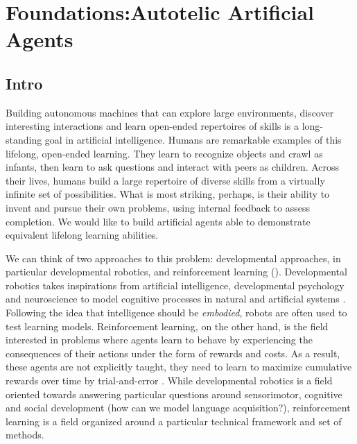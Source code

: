 \chapter{Foundations:Autotelic Artificial Agents}

\section{Intro}

Building autonomous machines that can explore large environments, discover interesting interactions and learn open-ended repertoires of skills is a long-standing goal in artificial intelligence. Humans are remarkable examples of this lifelong, open-ended learning. They learn to recognize objects and crawl as infants, then learn to ask questions and interact with peers as children. Across their lives, humans build a large repertoire of diverse skills from a virtually infinite set of possibilities. What is most striking, perhaps, is their ability to invent and pursue their own problems, using internal feedback to assess completion. We would like to build artificial agents able to demonstrate equivalent lifelong learning abilities.


We can think of two approaches to this problem: developmental approaches, in particular developmental robotics, and reinforcement learning (\rl). Developmental robotics takes inspirations from artificial intelligence, developmental psychology and neuroscience to model cognitive processes in natural and artificial systems \cite{asada2009cognitive,cangelosi2015developmental}. Following the idea that intelligence should be \textit{embodied}, robots are often used to test learning models. Reinforcement learning, on the other hand, is the field interested in problems where agents learn to behave by experiencing the consequences of their actions under the form of rewards and costs. As a result, these agents are not explicitly taught, they need to learn to maximize cumulative rewards over time by trial-and-error \cite{sutton2018reinforcement}. While developmental robotics is a field oriented towards answering particular questions around sensorimotor, cognitive and social development (\eg how can we model language acquisition?), reinforcement learning is a field organized around a particular technical framework and set of methods.


